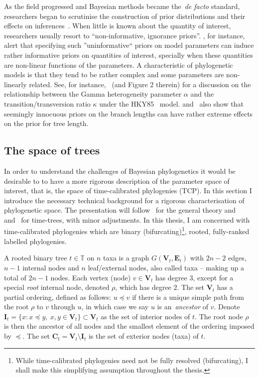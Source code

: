 As the field progressed and Bayesian methods became the~\textit{de facto} standard, researchers began to scrutinise the construction of prior distributions and their effects 
on inferences~\citep{Huelsenbeck2002,Yang2005,Alfaro2006}.
When little is known about the quantity of interest, researchers usually resort to ``non-informative, ignorance priors''.
\cite{Seaman2012}, for instance, alert that specifying such ''uninformative`` priors on model parameters can induce rather informative priors on quantities of interest, specially when these quantities are non-linear functions of the parameters.
A characteristic of phylogenetic models is that they tend to be rather complex and some parameters are non-linearly related.
See, for instance,~\cite{Yang1996} (and Figure 2 therein) for a discussion on the relationship between the Gamma heterogeneity parameter $\alpha$ and the transition/transversion ratio $\kappa$ under the HKY85~\citep{Hasegawa1985} model.
\cite{Rannala2012} and~\cite{Wang2014} also show that seemingly innocuous priors on the branch lengths can have rather extreme effects on the prior for tree length.

\subsection{The space of trees}
\label{sec:tree_space}

In order to understand the challenges of Bayesian phylogenetics it would be desirable to to have a more rigorous description of the parameter space of interest, that is, the space of time-calibrated phylogenies (TCP).
In this section I introduce the necessary technical background for a rigorous characterisation of phylogenetic space.
The presentation will follow~\cite{Semple2003} for the general theory and~\cite{Drummond2002} and~\cite{Gavryushkina2013} for time-trees, with minor adjustments.
In this thesis, I am concerned with time-calibrated phylogenies which are binary (bifurcating)\footnote{While time-calibrated phylogenies need not be fully resolved (bifurcating), I shall make this simplifying assumption throughout the thesis.}, rooted, fully-ranked labelled phylogenies.

A rooted binary tree $t \in \mathbb{T}$ on $n$ taxa is a graph $G(\boldsymbol V_t, \boldsymbol E_t)$ with $2n-2$ edges, $n-1$ internal nodes and $n$ leaf/external nodes, also called taxa -- making up a total of $2n-1$ nodes.
Each vertex (node) $v \in \boldsymbol V_t$ has degree $3$, except for a special \textit{root} internal node, denoted $\rho$, which has degree $2$.
The set $\boldsymbol V_t$ has a partial ordering, defined as follows: $u \preceq v$ if there is a unique simple path from the root $\rho$ to $v$ through $u$, in which case we say $u$ is an~\textit{ancestor} of $v$.
Denote $\boldsymbol I_t = \{ x:  x \preceq y, \: x,y \in \boldsymbol V_t \} \subset \boldsymbol V_t $ as the set of interior nodes of $t$.
The root node $\rho$ is then the ancestor of all nodes and the smallest element of the ordering imposed by $\preceq$.
The set $\boldsymbol C_t = \boldsymbol V_t \setminus \boldsymbol I_t$ is the set of exterior nodes (taxa) of $t$.

